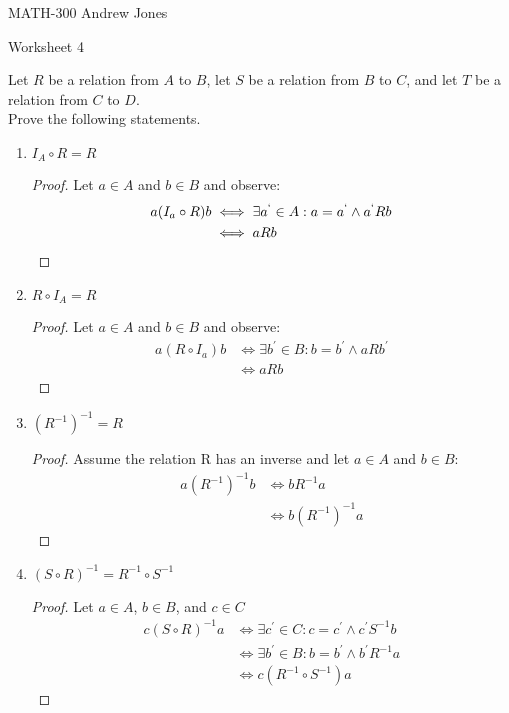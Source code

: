 \documentclass{article}
\begin{document}
    MATH-300 \hfill Andrew Jones
  \begin{center}
  {\huge Worksheet 4}
  \end{center}
  Let $R$ be a relation from $A$ to $B$, let $S$ be a relation from $B$ to $C$, and let $T$ be a relation from $C$ to $D$. \\ Prove the following statements. \\
  \begin{enumerate}
    \item $I_A \circ R = R$
      \begin{proof}
        Let $a\in A$ and $b\in B$ and observe:
        \begin{align*}
          a(I_a \circ R)b &\iff \exists a^`\in A: a = a^` \wedge a^`Rb \\
          &\iff aRb
        \end{align*}
      \end{proof}
    \item $R \circ I_A = R$
      \begin{proof}
        Let $a\in A$ and $b\in B$ and observe:
        \begin{align*}
          a(R \circ I_a)b &\iff \exists b^{'}\in B: b = b^{'} \wedge aRb^{'} \\
          &\iff aRb
        \end{align*}
      \end{proof}
    \item $(R^{-1})^{-1} = R$
      \begin{proof}
        Assume the relation R has an inverse and let $a\in A$ and $b\in B$:
        \begin{align*}
          a(R^{-1})^{-1}b &\iff bR^{-1}a \\
          &\iff b(R^{-1})^{-1}a
        \end{align*}
      \end{proof}
    \item $(S \circ R)^{-1} = R^{-1}\circ S^{-1}$
      \begin{proof}
        Let $a\in A$, $b\in B$, and $c\in C$
        \begin{align*}
          c(S \circ R)^{-1}a &\iff \exists c^{'}\in C: c = c^{'} \wedge c^{'}S^{-1}b \\
          &\iff \exists b^{'}\in B: b=b^{'} \wedge b^{'}R^{-1}a \\
          &\iff c(R^{-1} \circ S^{-1})a
        \end{align*}
      \end{proof}

\end{enumerate}
\end{document}
